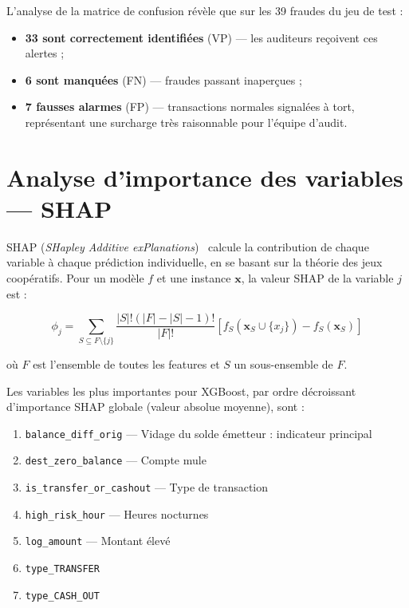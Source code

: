 \documentclass[12pt,a4paper,twoside]{report}
\theoremstyle{definition}
\begin{document}
L'analyse de la matrice de confusion révèle que sur les 39 fraudes du jeu de test :
\begin{itemize}
  \item \textbf{33 sont correctement identifiées} (VP) — les auditeurs reçoivent ces alertes ;
  \item \textbf{6 sont manquées} (FN) — fraudes passant inaperçues ;
  \item \textbf{7 fausses alarmes} (FP) — transactions normales signalées à tort,
    représentant une surcharge très raisonnable pour l'équipe d'audit.
\end{itemize}

\section{Analyse d'importance des variables — SHAP}

SHAP (\textit{SHapley Additive exPlanations})~\cite{lundberg2017unified} calcule
la contribution de chaque variable à chaque prédiction individuelle, en se basant
sur la théorie des jeux coopératifs. Pour un modèle $f$ et une instance $\mathbf{x}$,
la valeur SHAP de la variable $j$ est :

\begin{equation}
\phi_j = \sum_{S \subseteq F \setminus \{j\}}
  \frac{|S|!(|F|-|S|-1)!}{|F|!}
  \left[ f_S(\mathbf{x}_S \cup \{x_j\}) - f_S(\mathbf{x}_S) \right]
\label{eq:shap}
\end{equation}

où $F$ est l'ensemble de toutes les features et $S$ un sous-ensemble de $F$.


Les variables les plus importantes pour XGBoost, par ordre décroissant
d'importance SHAP globale (valeur absolue moyenne), sont :

\begin{enumerate}
  \item \texttt{balance\_diff\_orig} — Vidage du solde émetteur : indicateur principal \\
  \item \texttt{dest\_zero\_balance} — Compte mule \\
  \item \texttt{is\_transfer\_or\_cashout} — Type de transaction \\
  \item \texttt{high\_risk\_hour} — Heures nocturnes \\
  \item \texttt{log\_amount} — Montant élevé \\
  \item \texttt{type\_TRANSFER} \  \item \texttt{type\_CASH\_OUT}
\end{enumerate}
\end{document}
